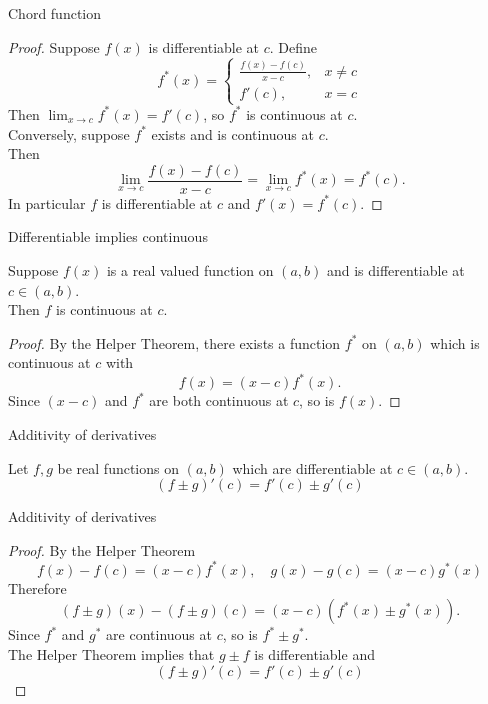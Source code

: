 \documentclass{beamer}
\begin{document}
\begin{frame}{Chord function}
\begin{proof}
\pause
Suppose $f(x)$ is differentiable at $c$.
\pause
Define
$$f^*(x) = \left\lbrace\begin{array}{cc}
\frac{f(x)-f(c)}{x-c}, & x\neq c\\
f'(c), & x= c
\end{array}\right.$$
\pause
Then $\lim_{x\rightarrow c} f^*(x) = f'(c)$, so $f^*$ is continuous at $c$.\\
\pause
Conversely, suppose $f^*$ exists and is continuous at $c$.\\
\pause
Then
$$\lim_{x\rightarrow c} \frac{f(x)-f(c)}{x-c} = \lim_{x\rightarrow c} f^*(x) = f^*(c).$$
\pause
In particular $f$ is differentiable at $c$ and $f'(x) = f^*(c)$.
\end{proof}
\end{frame}

\begin{frame}{Differentiable implies continuous}
\begin{thm}
Suppose $f(x)$ is a real valued function on $(a,b)$ and is differentiable at $c\in (a,b)$.\\
Then $f$ is continuous at $c$.
\end{thm}
\pause
\begin{proof}
\pause
By the Helper Theorem, there exists a function $f^*$ on $(a,b)$ which is continuous at $c$ with
$$f(x) = (x-c)f^*(x).$$
\pause
Since $(x-c)$ and $f^*$ are both continuous at $c$, so is $f(x)$.
\end{proof}
\end{frame}

\begin{frame}{Additivity of derivatives}
\begin{thm}
Let $f,g$ be real functions on $(a,b)$ which are differentiable at $c\in (a,b)$.\\
$$(f\pm g)'(c) = f'(c) \pm g'(c)$$
\end{thm}
\end{frame}

\begin{frame}{Additivity of derivatives}
\begin{proof}
\pause
By the Helper Theorem
$$f(x)-f(c) = (x-c)f^*(x),\quad g(x)-g(c) = (x-c)g^*(x)$$
\pause
Therefore
$$(f\pm g)(x) - (f\pm g)(c) = (x-c)(f^*(x) \pm g^*(x)).$$
\pause
Since $f^*$ and $g^*$ are continuous at $c$, so is $f^*\pm g^*$.\\
\pause
The Helper Theorem implies that $g\pm f$ is differentiable and
$$(f\pm g)'(c) = f'(c) \pm g'(c)$$
\end{proof}
\end{frame}
\end{document}
